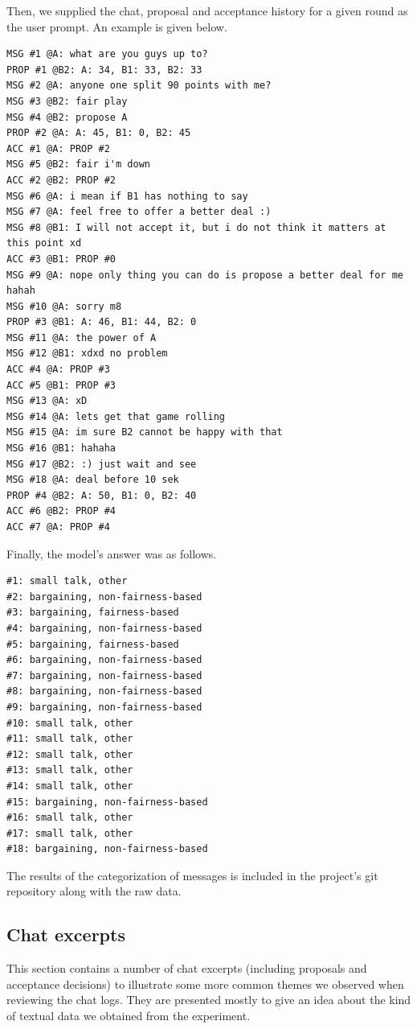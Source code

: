 Then, we supplied the chat, proposal and acceptance history for a given round as the user prompt. An example is given below.
\begin{lstlisting}[captionpos=b,caption=User prompt for GPT-4o]
MSG #1 @A: what are you guys up to?
PROP #1 @B2: A: 34, B1: 33, B2: 33
MSG #2 @A: anyone one split 90 points with me?
MSG #3 @B2: fair play
MSG #4 @B2: propose A
PROP #2 @A: A: 45, B1: 0, B2: 45
ACC #1 @A: PROP #2
MSG #5 @B2: fair i'm down
ACC #2 @B2: PROP #2
MSG #6 @A: i mean if B1 has nothing to say
MSG #7 @A: feel free to offer a better deal :)
MSG #8 @B1: I will not accept it, but i do not think it matters at this point xd
ACC #3 @B1: PROP #0
MSG #9 @A: nope only thing you can do is propose a better deal for me hahah
MSG #10 @A: sorry m8
PROP #3 @B1: A: 46, B1: 44, B2: 0
MSG #11 @A: the power of A
MSG #12 @B1: xdxd no problem
ACC #4 @A: PROP #3
ACC #5 @B1: PROP #3
MSG #13 @A: xD
MSG #14 @A: lets get that game rolling
MSG #15 @A: im sure B2 cannot be happy with that
MSG #16 @B1: hahaha
MSG #17 @B2: :) just wait and see
MSG #18 @A: deal before 10 sek
PROP #4 @B2: A: 50, B1: 0, B2: 40
ACC #6 @B2: PROP #4
ACC #7 @A: PROP #4
\end{lstlisting}

Finally, the model's answer was as follows.
\begin{lstlisting}[captionpos=b,caption=Answer from GPT-4o]
#1: small talk, other
#2: bargaining, non-fairness-based
#3: bargaining, fairness-based
#4: bargaining, non-fairness-based
#5: bargaining, fairness-based
#6: bargaining, non-fairness-based
#7: bargaining, non-fairness-based
#8: bargaining, non-fairness-based
#9: bargaining, non-fairness-based
#10: small talk, other
#11: small talk, other
#12: small talk, other
#13: small talk, other
#14: small talk, other
#15: bargaining, non-fairness-based
#16: small talk, other
#17: small talk, other
#18: bargaining, non-fairness-based
\end{lstlisting}

The results of the categorization of messages is included in the project's git repository along with the raw data.

\subsection{Chat excerpts}
\label{sec:chat_excerpts}

This section contains a number of chat excerpts (including proposals and acceptance decisions) to illustrate some more common themes we observed when reviewing the chat logs. They are presented mostly to give an idea about the kind of textual data we obtained from the experiment.

